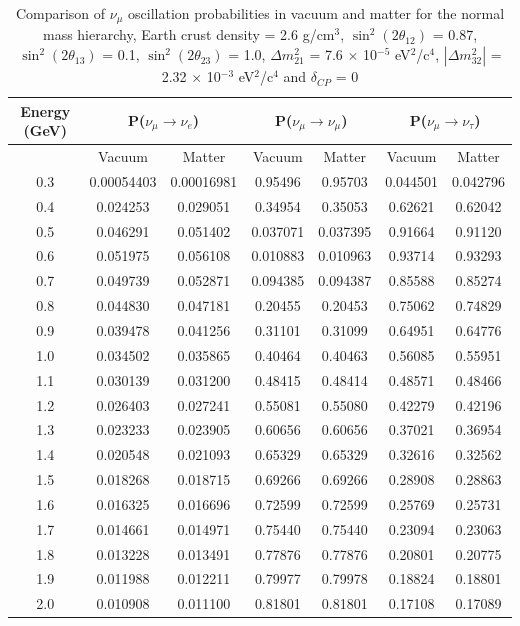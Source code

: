 \begin{table}
\caption[Comparison of $\nu_{\mu}$ oscillation probabilities in vacuum and matter for the normal mass hierarchy]
{Comparison of $\nu_{\mu}$ oscillation probabilities in vacuum and matter for the normal mass hierarchy, Earth crust
density = 2.6 g/cm$^{3}$, $ \sin^{2}(2 \theta_{12})$ = 0.87, $\sin^{2}(2 \theta_{13})$ = 0.1, $\sin^{2}(2 \theta_{23})$ = 1.0, 
$\Delta m_{21}^{2}$ = 7.6 $\times$ 10$^{-5}$ eV$^{2}$/c$^{4}$, $|\Delta m_{32}^{2}|$ = 2.32 $\times$ 10$^{-3}$ eV$^{2}$/c$^{4}$ and $\delta_{CP}$ = 0}
\centering
\begin{tabular}{| c | c | c | c | c | c | c |}
\hline
Energy (GeV) & \multicolumn{2}{|c|}{P($\nu_{\mu} \rightarrow \nu_{e}$)} & \multicolumn{2}{|c|}{P($\nu_{\mu} \rightarrow \nu_{\mu}$)} & \multicolumn{2}{|c|}{P($\nu_{\mu} \rightarrow \nu_{\tau}$)}\\
\hline
 & Vacuum & Matter & Vacuum & Matter & Vacuum & Matter \\
\hline
0.3 &  0.00054403 &  0.00016981 &  0.95496 &  0.95703 &  0.044501 &  0.042796\\
\hline
0.4 &  0.024253 &  0.029051 &  0.34954 &  0.35053 &  0.62621 &  0.62042\\
\hline
0.5 &  0.046291 &  0.051402 &  0.037071 &  0.037395 &  0.91664 &  0.91120\\
\hline
0.6 &  0.051975 &  0.056108 &  0.010883 &  0.010963 &  0.93714 &  0.93293\\
\hline
0.7 &  0.049739 &  0.052871 &  0.094385 &  0.094387 &  0.85588 &  0.85274\\
\hline
0.8 &  0.044830 &  0.047181 &  0.20455 &  0.20453 &  0.75062 &  0.74829\\
\hline
0.9 &  0.039478 &  0.041256 &  0.31101 &  0.31099 &  0.64951 &  0.64776\\
\hline
1.0 &  0.034502 &  0.035865 &  0.40464 &  0.40463 &  0.56085 &  0.55951\\
\hline
1.1 &  0.030139 &  0.031200 &  0.48415 &  0.48414 &  0.48571 &  0.48466\\
\hline
1.2 &  0.026403 &  0.027241 &  0.55081 &  0.55080 &  0.42279 &  0.42196\\
\hline
1.3 &  0.023233 &  0.023905 &  0.60656 &  0.60656 &  0.37021 &  0.36954\\
\hline
1.4 &  0.020548 &  0.021093 &  0.65329 &  0.65329 &  0.32616 &  0.32562\\
\hline
1.5 &  0.018268 &  0.018715 &  0.69266 &  0.69266 &  0.28908 &  0.28863\\
\hline
1.6 &  0.016325 &  0.016696 &  0.72599 &  0.72599 &  0.25769 &  0.25731\\
\hline
1.7 &  0.014661 &  0.014971 &  0.75440 &  0.75440 &  0.23094 &  0.23063\\
\hline
1.8 &  0.013228 &  0.013491 &  0.77876 &  0.77876 &  0.20801 &  0.20775\\
\hline
1.9 &  0.011988 &  0.012211 &  0.79977 &  0.79978 &  0.18824 &  0.18801\\
\hline
2.0 &  0.010908 &  0.011100 &  0.81801 &  0.81801 &  0.17108 &  0.17089\\
\hline
\end{tabular}
\label{numuOscMatterEffectsNH}
\end{table}

